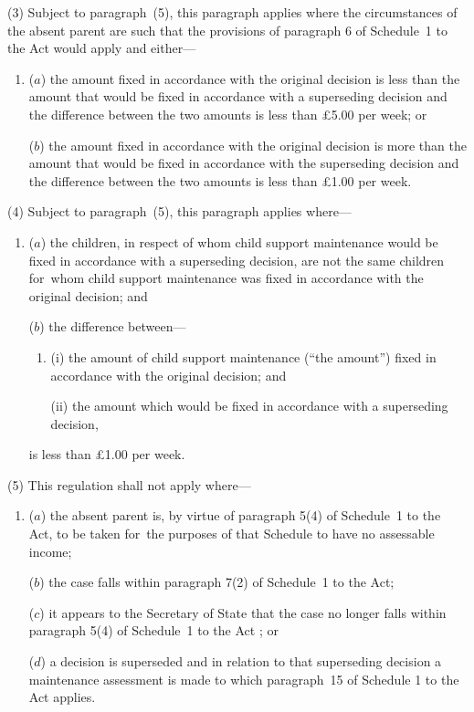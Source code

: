 \documentclass[a4paper,12pt]{article}
\begin{document}
(3) Subject to paragraph~(5), this paragraph applies where the circumstances of the absent parent are such that the provisions of paragraph 6 of Schedule~1 to the Act would apply and either---
\begin{enumerate}\item[]
($a$) the amount fixed in accordance with the original decision is less than the amount that would be fixed in accordance with a superseding decision and the difference between the two amounts is less than £5$.$00 per week; or

($b$) the amount fixed in accordance with the original decision is more than the amount that would be fixed in accordance with the superseding decision and the difference between the two amounts is less than £1$.$00 per week.
\end{enumerate}

(4) Subject to paragraph~(5), this paragraph applies where---
\begin{enumerate}\item[]
($a$) the children, in respect of whom child support maintenance would be fixed in accordance with a superseding decision, are not the same children for~whom child support maintenance was fixed in accordance with the original decision; and

($b$) the difference between---
\begin{enumerate}\item[]
(i) the amount of child support maintenance (“the amount”) fixed in accordance with the original decision; and

(ii) the amount which would be fixed in accordance with a superseding decision, 
\end{enumerate}
is less than £1$.$00 per week.
\end{enumerate}

(5) This regulation shall not apply where---
\begin{enumerate}\item[]
($a$) the absent parent is, by virtue of paragraph 5(4) of Schedule~1 to the Act, to be taken for~the purposes of that Schedule to have no assessable income;

($b$) the case falls within paragraph 7(2) of Schedule~1 to the Act; 

($c$) it appears to the Secretary of State that the case no longer falls within paragraph 5(4) of Schedule~1 to the Act%
%
; or

($d$) a decision is superseded and in relation to that superseding decision a maintenance assessment is made to which paragraph~15 of Schedule 1 to the Act applies.
\end{enumerate}
\end{document}
